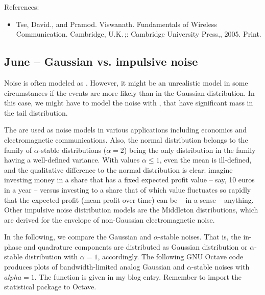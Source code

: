 \documentclass{article}
\begin{document}
References:
\begin{itemize}
\item 
  Tse, David., and Pramod. Viswanath. Fundamentals of Wireless Communication. Cambridge, U.K. ;: Cambridge University Press,, 2005. Print.

\end{itemize}

\subsection{June – Gaussian vs. impulsive noise}


Noise is often modeled as . However, it might be an unrealistic model in some circumstances if the  events are more likely than in the Gaussian distribution. In this case, we might have to model the noise with , that have significant mass in the tail distribution. 

The  are used as noise models in various applications including economics and electromagnetic communications. Also, the normal distribution belongs to the family of $\alpha$-stable distributions ($\alpha = 2$) being the only distribution in the family having a well-defined variance. With values $\alpha \leq 1$, even the mean is ill-defined, and the qualitative difference to the normal distribution is clear: imagine investing money in a share that has a fixed expected profit value – say, 10 euros in a year – versus investing to a share that of which value fluctuates so rapidly that the expected profit (mean profit over time) can be – in a sense – anything. Other impulsive noise distribution models are the Middleton distributions, which are derived for the envelope of non-Gaussian electromagnetic noise.

In the following, we compare the Gaussian and $\alpha$-stable noises. That is, the in-phase and quadrature components are distributed as Gaussian distribution or $\alpha$-stable distribution with $\alpha =1$, accordingly. The following GNU Octave code produces plots of bandwidth-limited analog Gaussian and  $\alpha$-stable noises with $alpha = 1$. The function  is given in my  blog entry. Remember to import the statistical package to Octave.
\end{document}
